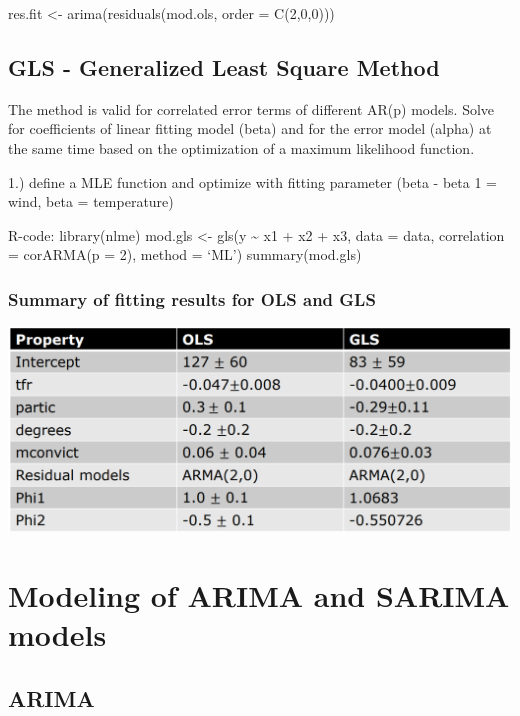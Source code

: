 \documentclass[
]{article}
\begin{document}
res.fit \textless- arima(residuals(mod.ols, order = C(2,0,0)))

\hypertarget{gls---generalized-least-square-method}{%
\subsection{GLS - Generalized Least Square
Method}\label{gls---generalized-least-square-method}}

The method is valid for correlated error terms of different AR(p)
models. Solve for coefficients of linear fitting model (beta) and for
the error model (alpha) at the same time based on the optimization of a
maximum likelihood function.

1.) define a MLE function and optimize with fitting parameter (beta -
beta 1 = wind, beta = temperature)

R-code: library(nlme) mod.gls \textless- gls(y \textasciitilde{} x1 + x2
+ x3, data = data, correlation = corARMA(p = 2), method = `ML')
summary(mod.gls)

\hypertarget{summary-of-fitting-results-for-ols-and-gls}{%
\subsubsection{Summary of fitting results for OLS and
GLS}\label{summary-of-fitting-results-for-ols-and-gls}}

\includegraphics[width=1\linewidth]{result}

\hypertarget{modeling-of-arima-and-sarima-models}{%
\section{Modeling of ARIMA and SARIMA
models}\label{modeling-of-arima-and-sarima-models}}

\hypertarget{arima}{%
\subsection{ARIMA}\label{arima}}
\end{document}
